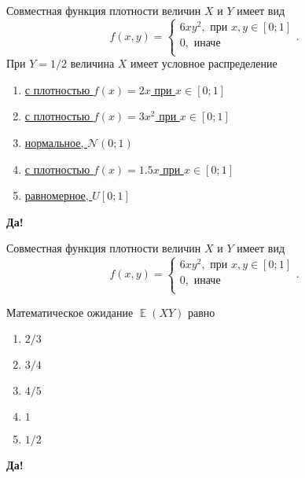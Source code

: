 \documentclass[t]{beamer}
\DeclareMathOperator{\E}{\mathbb{E}}
\newcommand{\cN}{\mathcal{N}}
\begin{document}
 \begin{frame} \label{38-Yes} 
\begin{block}{38} 

Совместная функция плотности величин $X$ и $Y$ имеет вид
\[
f(x,y) =
\begin{cases}
6xy^2, \text{ при } x, y \in [0;1] \\
0, \text{ иначе } \\
\end{cases}.
\]
При $Y=1/2$ величина $X$ имеет условное распределение
  


 \end{block} 
\begin{enumerate} 
\item[] \hyperlink{38-Yes}{\beamergotobutton{}  с плотностью $f(x)=2x$ при $x\in[0;1]$ }
\item[] \hyperlink{38-No}{\beamergotobutton{}  с плотностью $f(x)=3x^2$ при $x\in[0;1]$ }
\item[] \hyperlink{38-No}{\beamergotobutton{}  нормальное, $\cN(0;1)$ }
\item[] \hyperlink{38-No}{\beamergotobutton{}  с плотностью $f(x)=1.5x$ при $x\in[0;1]$ }
\item[] \hyperlink{38-No}{\beamergotobutton{}  равномерное, $U[0;1]$ }
\end{enumerate} 

 \textbf{Да!} 
 \hyperlink{39}{}\end{frame} 


 \begin{frame} \label{39-Yes} 
\begin{block}{39} 

Совместная функция плотности величин $X$ и $Y$ имеет вид
\[
f(x,y) =
\begin{cases}
6xy^2, \text{ при } x, y \in [0;1] \\
0, \text{ иначе } \\
\end{cases}.
\]

Математическое ожидание $\E(XY)$ равно
  


 \end{block} 
\begin{enumerate} 
\item[] \hyperlink{39-No}{\beamergotobutton{}   $2/3$ }
\item[] \hyperlink{39-No}{\beamergotobutton{}  $3/4$ }
\item[] \hyperlink{39-No}{\beamergotobutton{}  $4/5$ }
\item[] \hyperlink{39-No}{\beamergotobutton{}  $1$ }
\item[] \hyperlink{39-Yes}{\beamergotobutton{}  $1/2$ }
\end{enumerate} 

 \textbf{Да!} 
 \hyperlink{40}{}\end{frame} 
\end{document}
